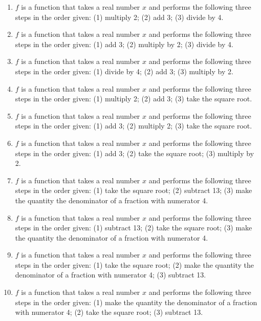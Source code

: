 \begin{enumerate}

\item $f$ is a function that takes a real number $x$ and performs the following three steps in the order given: (1) multiply 2; (2) add 3; (3) divide by 4. \label{buildfunctionfirst}

\item $f$ is a function that takes a real number $x$ and performs the following three steps in the order given: (1) add 3; (2) multiply by 2; (3) divide by 4. 

\item $f$ is a function that takes a real number $x$ and performs the following three steps in the order given: (1) divide by 4; (2) add 3; (3) multiply by 2.

\item $f$ is a function that takes a real number $x$ and performs the following three steps in the order given: (1) multiply 2; (2) add 3; (3) take the square root.

\item $f$ is a function that takes a real number $x$ and performs the following three steps in the order given: (1) add 3; (2) multiply 2; (3) take the square root.

\item $f$ is a function that takes a real number $x$ and performs the following three steps in the order given: (1) add 3; (2) take the square root; (3) multiply by 2.
\item $f$ is a function that takes a real number $x$ and performs the following three steps in the order given: (1) take the square root; (2) subtract 13; (3) make the quantity the denominator of a fraction with numerator 4. 

\item  $f$ is a function that takes a real number $x$ and performs the following three steps in the order given: (1) subtract 13; (2) take the square root; (3) make the quantity the denominator of a fraction with numerator 4.  

\item  $f$ is a function that takes a real number $x$ and performs the following three steps in the order given: (1) take the square root; (2) make the quantity the denominator of a fraction with numerator 4; (3) subtract 13. 

\item  $f$ is a function that takes a real number $x$ and performs the following three steps in the order given: (1) make the quantity the denominator of a fraction with numerator 4; (2) take the square root; (3) subtract 13. \label{buildfunctionlast}

\setcounter{HW}{\value{enumi}}
\end{enumerate}

